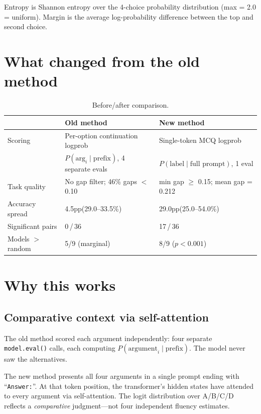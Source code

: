 \documentclass[11pt,a4paper]{article}
\begin{document}
Entropy is Shannon entropy over the 4-choice probability distribution (max = 2.0 = uniform).
Margin is the average log-probability difference between the top and second choice.

\section{What changed from the old method}

\begin{table}[h]
\centering
\caption{Before/after comparison.}
\vspace{4pt}
\begin{tabular}{@{}lll@{}}
\toprule
& \textbf{Old method} & \textbf{New method} \\
\midrule
Scoring & Per-option continuation logprob & Single-token MCQ logprob \\
& $P(\text{arg}_i \mid \text{prefix})$, 4 separate evals & $P(\text{label} \mid \text{full prompt})$, 1 eval \\
\addlinespace
Task quality & No gap filter; 46\% gaps $<$ 0.10 & min gap $\geq$ 0.15; mean gap = 0.212 \\
\addlinespace
Accuracy spread & 4.5pp\enspace(29.0--33.5\%) & 29.0pp\enspace(25.0--54.0\%) \\
Significant pairs & 0\,/\,36 & 17\,/\,36 \\
Models $>$ random & 5/9 (marginal) & 8/9 ($p < 0.001$) \\
\bottomrule
\end{tabular}
\label{tab:comparison}
\end{table}

\section{Why this works}

\subsection{Comparative context via self-attention}

The old method scored each argument independently: four separate \texttt{model.eval()} calls, each computing $P(\text{argument}_i \mid \text{prefix})$.
The model never saw the alternatives.

The new method presents all four arguments in a single prompt ending with ``\texttt{Answer:}''. At that token position, the transformer's hidden states have attended to every argument via self-attention. The logit distribution over A/B/C/D reflects a \emph{comparative} judgment---not four independent fluency estimates.
\end{document}
